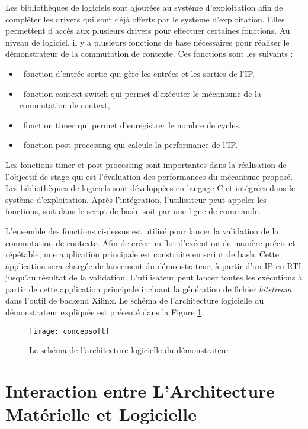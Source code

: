 Les bibliothèques de logiciels sont ajoutées au système d'exploitation afin de compléter les drivers qui sont déjà offerts par
le système d'exploitation. Elles permettent d'accès aux plusieurs drivers pour effectuer certaines fonctions.
Au niveau de logiciel, il y a plusieurs fonctions de base nécessaires pour réaliser le démonstrateur de la commutation
de contexte. Ces fonctions sont les suivants :
\begin{itemize}
	\item\ fonction d'entrée-sortie qui gère les entrées et les sorties de l'IP, 
	\item\ fonction context switch qui permet d'exécuter le mécanisme de la commutation de context, 
	\item\ fonction timer qui permet d'enregistrer le nombre de cycles,
	\item\ fonction post-processing qui calcule la performance de l'IP.
\end{itemize}
Les fonctions timer et post-processing sont importantes dans la réalisation de l'objectif de stage qui est l'évaluation des performances
du mécanisme proposé. Les bibliothèques de logiciels sont développées en langage C et intégrées dans le système d'exploitation.
Après l'intégration, l'utilisateur peut appeler les fonctions, soit dans le script de bash, soit par une ligne de commande.

L'ensemble des fonctions ci-dessus est utilisé pour lancer la validation de la commutation de contexte.
Afin de créer un flot d'exécution de manière précis et répétable, une application principale est construite en script de bash. 
Cette application sera chargée de lancement du démonstrateur, à partir d'un IP en RTL jusqu'au résultat de la validation.
L'utilisateur peut lancer toutes les exécutions à partir de cette application principale incluant la génération de fichier
\emph{bitstream} dans l'outil de backend Xilinx.
Le schéma de l'architecture logicielle du démonstrateur expliquée est présenté dans la Figure \ref{fig:concepsoft}.

\begin{figure}[h]
	\centering
	\texttt{[image: concepsoft]}
	\caption{Le schéma de l'architecture logicielle du démonstrateur}
	\label{fig:concepsoft}
	\vspace{-2mm}
\end{figure}

\section{Interaction entre L'Architecture Matérielle et Logicielle}

